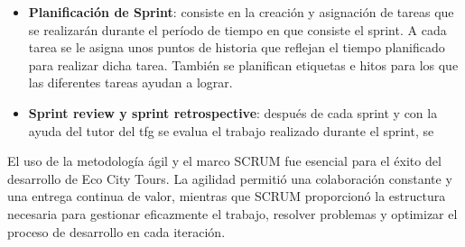\begin{itemize}
	\item \textbf{Planificación de Sprint}: consiste en la creación y asignación de tareas que se realizarán durante el período de tiempo en que consiste el sprint. A cada tarea se le asigna unos puntos de historia que reflejan el tiempo planificado para realizar dicha tarea. También se planifican etiquetas e hitos para los que las diferentes tareas ayudan a lograr.
	\item \textbf{Sprint review y sprint retrospective}: después de cada sprint y con la ayuda del tutor del \acrshort{tfg} se evalua el trabajo realizado durante el sprint, se 
	
\end{itemize}

El uso de la metodología ágil y el marco SCRUM fue esencial para el éxito del desarrollo de Eco City Tours. La agilidad permitió una colaboración constante y una entrega continua de valor, mientras que SCRUM proporcionó la estructura necesaria para gestionar eficazmente el trabajo, resolver problemas y optimizar el proceso de desarrollo en cada iteración.